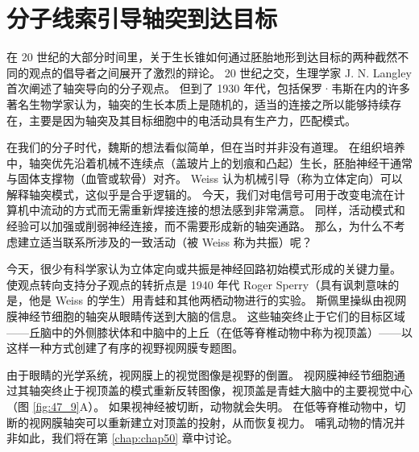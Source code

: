 \section{分子线索引导轴突到达目标}
在 20 世纪的大部分时间里，关于生长锥如何通过胚胎地形到达目标的两种截然不同的观点的倡导者之间展开了激烈的辩论。 20 世纪之交，生理学家 J. N. Langley 首次阐述了轴突导向的分子观点。 但到了 1930 年代，包括保罗·韦斯在内的许多著名生物学家认为，轴突的生长本质上是随机的，适当的连接之所以能够持续存在，主要是因为轴突及其目标细胞中的电活动具有生产力，匹配模式。

在我们的分子时代，魏斯的想法看似简单，但在当时并非没有道理。 在组织培养中，轴突优先沿着机械不连续点（盖玻片上的划痕和凸起）生长，胚胎神经干通常与固体支撑物（血管或软骨）对齐。 Weiss 认为机械引导（称为立体定向）可以解释轴突模式，这似乎是合乎逻辑的。 今天，我们对电信号可用于改变电流在计算机中流动的方式而无需重新焊接连接的想法感到非常满意。 同样，活动模式和经验可以加强或削弱神经连接，而不需要形成新的轴突通路。 那么，为什么不考虑建立适当联系所涉及的一致活动（被 Weiss 称为共振）呢？

今天，很少有科学家认为立体定向或共振是神经回路初始模式形成的关键力量。 使观点转向支持分子观点的转折点是 1940 年代 Roger Sperry（具有讽刺意味的是，他是 Weiss 的学生）用青蛙和其他两栖动物进行的实验。 斯佩里操纵由视网膜神经节细胞的轴突从眼睛传送到大脑的信息。 这些轴突终止于它们的目标区域——丘脑中的外侧膝状体和中脑中的上丘（在低等脊椎动物中称为视顶盖）——以这样一种方式创建了有序的视野视网膜专题图。

由于眼睛的光学系统，视网膜上的视觉图像是视野的倒置。 
视网膜神经节细胞通过其轴突终止于视顶盖的模式重新反转图像，视顶盖是青蛙大脑中的主要视觉中心（图 \ref{fig:47_9}A）。
如果视神经被切断，动物就会失明。 在低等脊椎动物中，切断的视网膜轴突可以重新建立对顶盖的投射，从而恢复视力。 哺乳动物的情况并非如此，我们将在第 \ref{chap:chap50} 章中讨论。

